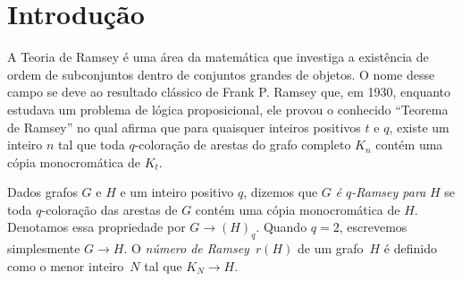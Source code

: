 \documentclass[12pt,a4paper]{book}
\begin{document}
\fancyhead[RE,LO]{\thesection}

\onehalfspacing            %




\chapter{Introdução}
\label{sec:intro}


A Teoria de Ramsey é uma área da matemática que investiga a existência de ordem de subconjuntos dentro de conjuntos grandes de objetos. 
O nome desse campo se deve ao resultado clássico de Frank P. Ramsey \cite{Ra} que, em 1930, enquanto estudava um problema de lógica proposicional, ele provou o conhecido ``Teorema de Ramsey'' no qual afirma que para quaisquer inteiros positivos $t$ e $q$, existe um inteiro $n$ tal que toda $q$-coloração de arestas do grafo completo $K_n$ contém uma cópia monocromática de $K_t$.


Dados grafos $G$ e $H$ e um inteiro positivo $q$, dizemos que $G$
\emph{é $q$-Ramsey para} $H$ se toda $q$-coloração das arestas de $G$ contém uma cópia monocromática de $H$.
Denotamos essa propriedade por $G\rightarrow (H)_q$.
Quando $q=2$, escrevemos simplesmente $G\rightarrow H$.
O \emph{número de Ramsey}~$r(H)$ de um grafo~$H$ é definido como o menor inteiro~$N$  tal que $K_N \rightarrow H$.
\end{document}
